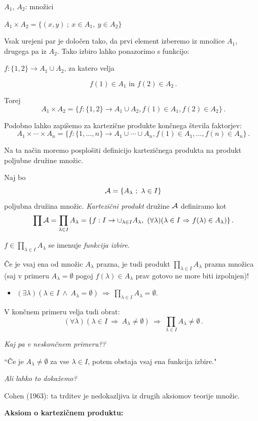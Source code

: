 \documentclass[11pt,paper=b5,footinclude,headinclude]{scrbook} %
\def\inn {{~\wedge~}}
\def\sledi {{~\Rightarrow~}}
\begin{document}
$A_1$, $A_2$: množici

$A_1\times A_2 = \{(x,y)~;~x\in A_1,~y\in A_2\}$

Vsak urejeni par je določen tako, da prvi element izberemo iz množice $A_1$, drugega pa iz $A_2$. Tako izbiro lahko ponazorimo s funkcijo:

$f:\{1,2\} \to A_1\cup A_2$, za katero velja

$$f(1)\in A_1 \textrm{ in }f(2)\in A_2\,.$$

Torej
$$A_1\times A_2 = \{f:\{1,2\} \to A_1\cup A_2,
f(1)\in A_1, f(2)\in A_2\}\,.$$

Podobno lahko zapišemo za kartezične produkte končnega števila faktorjev:
$$A_1\times \cdots \times A_n= \{f:\{1,\ldots, n\} \to A_1\cup \cdots\cup A_n,
f(1)\in A_1, \ldots, f(n)\in A_n\}\,.$$

\bigskip
Na ta način moremo posplošiti definicijo kartezičnega produkta na produkt poljubne družine množic.

Naj bo
$${\cal A}=\{A_{\lambda}~;~\lambda\in I\}$$
poljubna družina množic. {\em Kartezični produkt} družine ${\cal A}$ definiramo kot $$\prod{\cal A} = \prod_{\lambda\in I}A_\lambda = \{f:I\to\cup_{\lambda\in I}A_\lambda,~(\forall\lambda)(\lambda\in I\sledi f(\lambda)\in A_\lambda)\}\,.$$

$f\in \prod_{\lambda\in I}A_\lambda$ se imenuje {\em funkcija izbire}.

Če je vsaj ena od množic $A_\lambda$ prazna, je tudi produkt $\prod_{\lambda\in I}A_\lambda$ prazna množica (saj v primeru $A_\lambda = \emptyset$ pogoj $f(\lambda) \in A_\lambda$ prav gotovo ne more biti izpolnjen)!
\begin{itemize}
  \item $(\exists \lambda)(\lambda\in I\inn A_\lambda = \emptyset)\sledi \prod_{\lambda\in I}A_\lambda=\emptyset$.
\end{itemize}

V končnem primeru velja tudi obrat:
$$(\forall \lambda)(\lambda\in I\sledi A_\lambda\neq\emptyset)\sledi
      \prod_{\lambda\in I}A_\lambda\neq\emptyset\,.$$

{\em Kaj pa v neskončnem primeru??}

``Če je $A_\lambda\neq \emptyset$ za vse $\lambda\in I$, potem obstaja vsaj ena funkcija izbire."~

{\em Ali lahko to dokažemo?}

Cohen (1963): ta trditev je nedokazljiva iz drugih aksiomov teorije množic.

\bigskip
\textbf{Aksiom o kartezičnem produktu:}
\end{document}
